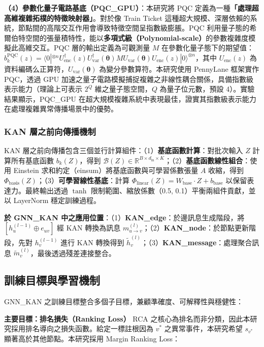 \documentclass[10pt,a4paper,twocolumn]{article}
\begin{document}
\textbf{（4）參數化量子電路基底（PQC\_GPU）}：本研究將 PQC 定義為一種\textbf{「處理超高維複雜拓樸的特徵映射器」}。對於像 Train Ticket 這種超大規模、深層依賴的系統，節點間的高階交互作用會導致特徵空間呈指數級膨脹。PQC 利用量子態的希爾伯特空間的張量積特性，能以\textbf{多項式級（Polynomial-scale）}的參數複雜度模擬此高維交互。PQC 層的輸出定義為可觀測量 $M$ 在參數化量子態下的期望值：$b_k^{\text{PQC}}(z) = \langle 0|^{\otimes n} U^\dagger_{\text{enc}}(z) U^\dagger_{\text{var}}(\boldsymbol{\theta}) M U_{\text{var}}(\boldsymbol{\theta}) U_{\text{enc}}(z) |0\rangle^{\otimes n}$，其中 $U_{\text{enc}}(z)$ 為資料編碼么正算符，$U_{\text{var}}(\boldsymbol{\theta})$ 為變分參數算符。本研究使用 PennyLane 框架實作 PQC，透過 GPU 加速之量子電路模擬捕捉複雜之非線性耦合關係，具備指數級表示能力（理論上可表示 $2^Q$ 維之量子態空間，$Q$ 為量子位元數，預設 4）。實驗結果顯示，PQC\_GPU 在超大規模複雜系統中表現最佳，證實其指數級表示能力在處理複雜異常傳播場景中的優勢。

\subsubsection{KAN 層之前向傳播機制}

KAN 層之前向傳播包含三個並行計算組件：（1）\textbf{基底函數計算}：對批次輸入 $Z$ 計算所有基底函數 $b_k(Z)$，得到 $\mathcal{B}(Z) \in \mathbb{R}^{B \times d_{\text{in}} \times K}$；（2）\textbf{基底函數線性組合}：使用 Einstein 求和約定（einsum）將基底函數與可學習係數張量 $A$ 收縮，得到 $\Phi_{\text{basis}}(Z)$；（3）\textbf{可學習線性基底}：計算 $\Phi_{\text{linear}}(Z) = W_{\text{base}} \cdot Z + b_{\text{base}}$ 以保留表達力。最終輸出透過 $\tanh$ 限制範圍、縮放係數（0.5, 0.1）平衡兩組件貢獻，並以 LayerNorm 穩定訓練過程。

\textbf{於 GNN\_KAN 中之應用位置}：（1）\textbf{KAN\_edge}：於邊訊息生成階段，將 $[h_u^{(l-1)} \oplus e_{uv}]$ 經 KAN 轉換為訊息 $m_{u \to v}^{(l)}$；（2）\textbf{KAN\_node}：於節點更新階段，先對 $h_v^{(l-1)}$ 進行 KAN 轉換得到 $\tilde{h}_v^{(l)}$；（3）\textbf{KAN\_message}：處理聚合訊息 $\tilde{m}_v^{(l)}$，最後透過殘差連接整合。

\subsection{訓練目標與學習機制}

GNN\_KAN 之訓練目標整合多個子目標，兼顧準確度、可解釋性與穩健性：

\textbf{主要目標：排名損失（Ranking Loss）}  
RCA 之核心為排名而非分類，因此本研究採用排名導向之損失函數。給定一標註根因為 $v^*$ 之異常事件，本研究希望 $s_{v^*}$ 顯著高於其他節點。本研究採用 Margin Ranking Loss：
\end{document}
